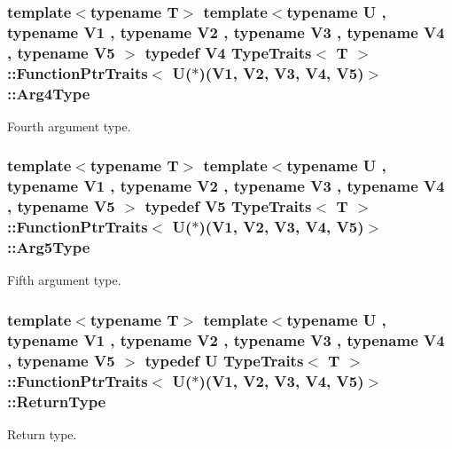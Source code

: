 \subsubsection[{\texorpdfstring{Arg4\+Type}{Arg4Type}}]{\setlength{\rightskip}{0pt plus 5cm}template$<$typename T$>$ template$<$typename U , typename V1 , typename V2 , typename V3 , typename V4 , typename V5 $>$ typedef V4 {\bf Type\+Traits}$<$ T $>$\+::{\bf Function\+Ptr\+Traits}$<$ U($\ast$)(V1, V2, V3, V4, V5)$>$\+::{\bf Arg4\+Type}}\hypertarget{structTypeTraits_1_1FunctionPtrTraits_3_01U_07_5_08_07V1_00_01V2_00_01V3_00_01V4_00_01V5_08_4_a8e5182de8adeb51001eeee10d5224a6f}{}\label{structTypeTraits_1_1FunctionPtrTraits_3_01U_07_5_08_07V1_00_01V2_00_01V3_00_01V4_00_01V5_08_4_a8e5182de8adeb51001eeee10d5224a6f}
Fourth argument type. 
\subsubsection[{\texorpdfstring{Arg5\+Type}{Arg5Type}}]{\setlength{\rightskip}{0pt plus 5cm}template$<$typename T$>$ template$<$typename U , typename V1 , typename V2 , typename V3 , typename V4 , typename V5 $>$ typedef V5 {\bf Type\+Traits}$<$ T $>$\+::{\bf Function\+Ptr\+Traits}$<$ U($\ast$)(V1, V2, V3, V4, V5)$>$\+::{\bf Arg5\+Type}}\hypertarget{structTypeTraits_1_1FunctionPtrTraits_3_01U_07_5_08_07V1_00_01V2_00_01V3_00_01V4_00_01V5_08_4_a22781a60395a87f5cb322d6271f8df2f}{}\label{structTypeTraits_1_1FunctionPtrTraits_3_01U_07_5_08_07V1_00_01V2_00_01V3_00_01V4_00_01V5_08_4_a22781a60395a87f5cb322d6271f8df2f}
Fifth argument type. 
\subsubsection[{\texorpdfstring{Return\+Type}{ReturnType}}]{\setlength{\rightskip}{0pt plus 5cm}template$<$typename T$>$ template$<$typename U , typename V1 , typename V2 , typename V3 , typename V4 , typename V5 $>$ typedef U {\bf Type\+Traits}$<$ T $>$\+::{\bf Function\+Ptr\+Traits}$<$ U($\ast$)(V1, V2, V3, V4, V5)$>$\+::{\bf Return\+Type}}\hypertarget{structTypeTraits_1_1FunctionPtrTraits_3_01U_07_5_08_07V1_00_01V2_00_01V3_00_01V4_00_01V5_08_4_abd8e460bfb3552591173e46421474d21}{}\label{structTypeTraits_1_1FunctionPtrTraits_3_01U_07_5_08_07V1_00_01V2_00_01V3_00_01V4_00_01V5_08_4_abd8e460bfb3552591173e46421474d21}
Return type. 

